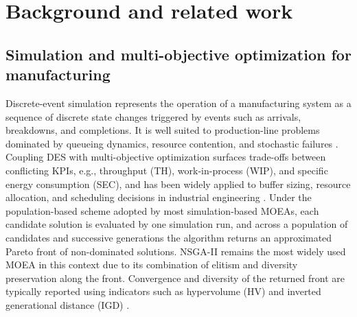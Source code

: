 \documentclass[a4paper,fleqn]{cas-sc}
\begin{document}




\section{Background and related work}\label{sec:related}                           
  \subsection{Simulation and multi-objective optimization for manufacturing}\label{sec:related-des}                     
     
  Discrete-event simulation represents the operation of a manufacturing system as a sequence of discrete state changes triggered by events such as arrivals, breakdowns, and completions. It is well suited to production-line problems   
  dominated by queueing dynamics, resource contention, and stochastic failures \citep{Mawson2019,Greasley2019}. Coupling DES with multi-objective optimization surfaces trade-offs between conflicting KPIs, e.g., throughput (TH), work-in-process (WIP), and specific energy consumption (SEC), and has been widely applied to buffer sizing, resource
   allocation, and scheduling decisions in industrial engineering \citep{Wang2011,Ojstersek2020}. Under the             
  population-based scheme adopted by most simulation-based MOEAs, each candidate solution is evaluated by one simulation
   run, and across a population of candidates and successive generations the algorithm returns an approximated Pareto   
  front of non-dominated solutions.
  NSGA-II \citep{Deb2002nsga2} remains the most widely used MOEA in this context due to its combination of elitism and diversity preservation along the front. Convergence and diversity of the returned   
  front are typically reported using indicators such as hypervolume (HV) and inverted generational distance (IGD)
  \citep{LiYao2019qi}.
\end{document}
